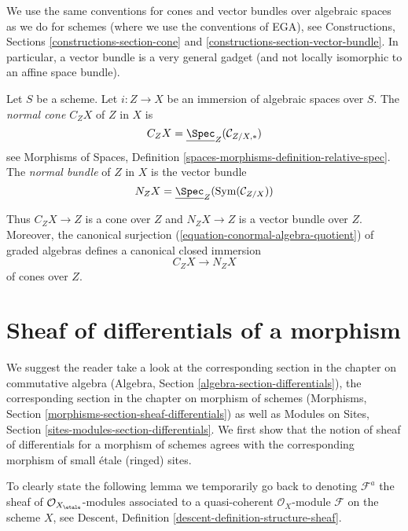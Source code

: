 \noindent
We use the same conventions for cones and vector bundles over
algebraic spaces as we do for schemes (where we use
the conventions of EGA), see
Constructions, Sections \ref{constructions-section-cone} and
\ref{constructions-section-vector-bundle}.
In particular, a vector bundle is a very general gadget
(and not locally isomorphic to an affine space bundle).

\begin{definition}
\label{definition-normal-cone}
Let $S$ be a scheme. Let $i : Z \to X$ be an immersion of algebraic spaces
over $S$. The {\it normal cone $C_ZX$} of $Z$ in $X$ is
$$
C_ZX = \underline{\Spec}_Z(\mathcal{C}_{Z/X, *})
$$
see Morphisms of Spaces,
Definition \ref{spaces-morphisms-definition-relative-spec}. The
{\it normal bundle} of $Z$ in $X$ is the vector bundle
$$
N_ZX = \underline{\Spec}_Z(\text{Sym}(\mathcal{C}_{Z/X}))
$$
\end{definition}

\noindent
Thus $C_ZX \to Z$ is a cone over $Z$ and $N_ZX \to Z$ is a vector bundle
over $Z$. Moreover, the canonical surjection
(\ref{equation-conormal-algebra-quotient}) of graded algebras
defines a canonical closed immersion
\begin{equation}
\label{equation-normal-cone-in-normal-bundle}
C_ZX \longrightarrow N_ZX
\end{equation}
of cones over $Z$.










\section{Sheaf of differentials of a morphism}
\label{section-sheaf-differentials}

\noindent
We suggest the reader take a look at the corresponding section
in the chapter on commutative algebra
(Algebra, Section \ref{algebra-section-differentials}),
the corresponding section in the chapter on morphism of schemes
(Morphisms, Section \ref{morphisms-section-sheaf-differentials})
as well as
Modules on Sites, Section \ref{sites-modules-section-differentials}.
We first show that the notion of sheaf of differentials for a
morphism of schemes agrees with the corresponding morphism of
small \'etale (ringed) sites.

\medskip\noindent
To clearly state the following lemma we temporarily go back to
denoting $\mathcal{F}^a$ the sheaf of $\mathcal{O}_{X_\etale}$-modules
associated to a quasi-coherent $\mathcal{O}_X$-module $\mathcal{F}$
on the scheme $X$, see
Descent, Definition \ref{descent-definition-structure-sheaf}.

